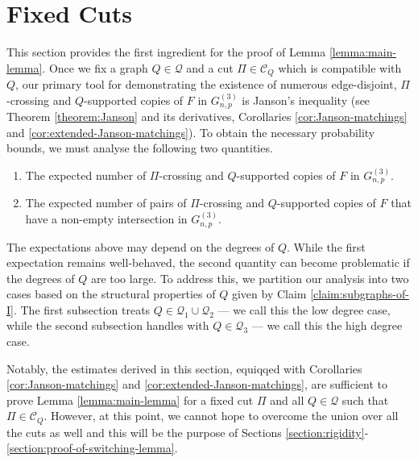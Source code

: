 \documentclass[11pt,a4paper,oneside,reqno]{amsart}
\newcommand{\Gnp}{G_{n, p}^{(3)}}
\newcommand{\cC}{\mathcal{C}}
\newcommand{\cQ}{\mathcal{Q}}
\newcommand{\cT}{\mathcal{T}}
\renewcommand{\Pr}{\mathbb{P}}
\newcommand{\1}{\mathbbm{1}} %
\begin{document}

\section{Fixed Cuts}\label{section:fixed-cuts}
This section provides the first ingredient for the proof of Lemma \ref{lemma:main-lemma}. Once we fix a graph $Q \in \cQ$ and a cut $\Pi \in \cC_Q$ which is compatible with $Q$, our primary tool for demonstrating the existence of numerous edge-disjoint, $\Pi$-crossing and $Q$-supported copies of $F$ in $\Gnp$ is Janson's inequality (see Theorem \ref{theorem:Janson} and its derivatives, Corollaries \ref{cor:Janson-matchings} and \ref{cor:extended-Janson-matchings}). To obtain the necessary probability bounds, we must analyse the following two quantities.
\begin{enumerate}
    \item The expected number of $\Pi$-crossing and $Q$-supported copies of $F$ in $\Gnp$.
    \item The expected number of pairs of $\Pi$-crossing and $Q$-supported copies of $F$ that have a non-empty intersection in $\Gnp$.
\end{enumerate}

The expectations above may depend on the degrees of $Q$. While the first expectation remains well-behaved, the second quantity can become problematic if the degrees of $Q$ are too large. To address this, we partition our analysis into two cases based on the structural properties of $Q$ given by Claim \ref{claim:subgraphs-of-I}. The first subsection treats $Q \in \cQ_1 \cup \cQ_2$ --- we call this the low degree case, while the second subsection handles with $Q \in \cQ_3$ --- we call this the high degree case. 

Notably, the estimates derived in this section, equiqqed with Corollaries \ref{cor:Janson-matchings} and \ref{cor:extended-Janson-matchings}, are sufficient to prove Lemma \ref{lemma:main-lemma} for a fixed cut $\Pi$ and all $Q \in \cQ$ such that $\Pi \in \cC_Q$. However, at this point, we cannot hope to overcome the union over all the cuts as well and this will be the purpose of Sections \ref{section:rigidity}-\ref{section:proof-of-switching-lemma}.
\end{document}
